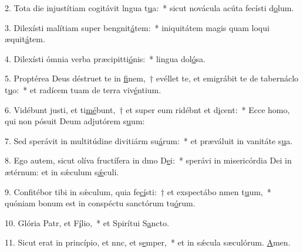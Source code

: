2. Tota die injustítiam cogitávit lngua t\uline{u}a:~* sicut novácula acúta fecísti d\uline{o}lum.\par 
3. Dilexísti malítiam super bengnit\uline{á}tem:~* iniquitátem magis quam loqui æquit\uline{á}tem.\par 
4. Dilexísti ómnia verba præcipitti\uline{ó}nis:~* lingua dol\uline{ó}sa.\par 
5. Proptérea Deus déstruet te in \uline{fi}nem,~† evéllet te, et emigrábit te de tabernáclo t\uline{u}o:~* et radícem tuam de terra viv\uline{é}ntium.\par 
6. Vidébunt justi, et ti\uline{mé}bunt,~† et super eum ridébnt et d\uline{i}cent:~* Ecce homo, qui non pósuit Deum adjutórem s\uline{u}um:\par 
7. Sed sperávit in multitúdine divitiárm su\uline{á}rum:~* et præváluit in vanitáte s\uline{u}a.\par 
8. Ego autem, sicut olíva fructífera in dmo D\uline{e}i:~* sperávi in misericórdia Dei in ætérnum: et in sǽculum s\uline{ǽ}culi.\par 
9. Confitébor tibi in sǽculum, quia fe\uline{cí}sti:~† et exspectábo nmen t\uline{u}um,~* quóniam bonum est in conspéctu sanctórum tu\uline{ó}rum.\par 
10. Glória Patr, et F\uline{í}lio,~* et Spirítui S\uline{a}ncto.\par 
11. Sicut erat in princípio, et nnc, et s\uline{e}mper,~* et in sǽcula sæculórum. \uline{A}men.\par 
